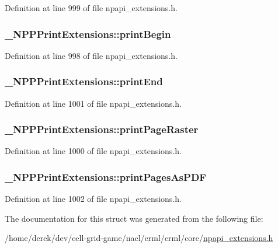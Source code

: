 Definition at line 999 of file npapi\_\-extensions.h.

\hypertarget{struct___n_p_p_print_extensions_adc640a1e956dbf4b1805fc016c232245}{
\subsubsection[{printBegin}]{ {\bf \_\-NPPPrintExtensions::printBegin}}}
\label{struct___n_p_p_print_extensions_adc640a1e956dbf4b1805fc016c232245}


Definition at line 998 of file npapi\_\-extensions.h.

\hypertarget{struct___n_p_p_print_extensions_aa50681f978976055b93ce16a2dfa33be}{
\subsubsection[{printEnd}]{ {\bf \_\-NPPPrintExtensions::printEnd}}}
\label{struct___n_p_p_print_extensions_aa50681f978976055b93ce16a2dfa33be}


Definition at line 1001 of file npapi\_\-extensions.h.

\hypertarget{struct___n_p_p_print_extensions_a0ebae32fa147d33669f1454511171122}{
\subsubsection[{printPageRaster}]{ {\bf \_\-NPPPrintExtensions::printPageRaster}}}
\label{struct___n_p_p_print_extensions_a0ebae32fa147d33669f1454511171122}


Definition at line 1000 of file npapi\_\-extensions.h.

\hypertarget{struct___n_p_p_print_extensions_ad4295879540311ab6186f58718dc61df}{
\subsubsection[{printPagesAsPDF}]{ {\bf \_\-NPPPrintExtensions::printPagesAsPDF}}}
\label{struct___n_p_p_print_extensions_ad4295879540311ab6186f58718dc61df}


Definition at line 1002 of file npapi\_\-extensions.h.



The documentation for this struct was generated from the following file:\begin{DoxyCompactItemize}
\item 
/home/derek/dev/cell-\/grid-\/game/nacl/crml/crml/core/\hyperlink{npapi__extensions_8h}{npapi\_\-extensions.h}\end{DoxyCompactItemize}
